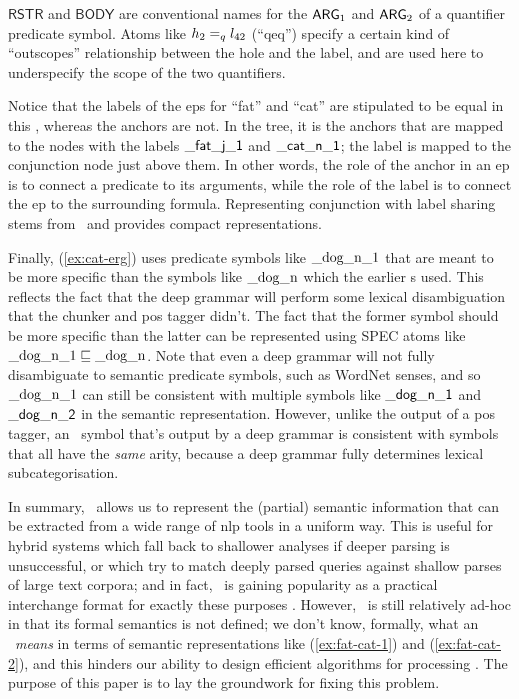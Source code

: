 $\mathsf{RSTR}$ and $\mathsf{BODY}$ are conventional names
for the $\mathsf{ARG}_1$ and $\mathsf{ARG}_2$ of a quantifier predicate symbol.  Atoms
like $h_2 =_q l_{42}$ (``qeq'') specify a certain kind of
``outscopes'' relationship between the hole and the label, and are
used here to underspecify the scope of the two quantifiers.

Notice that the labels of the {\sc ep}s for ``fat'' and ``cat'' are
stipulated to be equal in this \rmrs, whereas the anchors are not.  In
the tree, it is the anchors that are mapped to the nodes with the
labels $\mathsf{\_fat\_j\_1}$ and $\mathsf{\_cat\_n\_1}$; the label is
mapped to the conjunction node just above them.  In other words, the
role of the anchor in an {\sc ep} is to connect a predicate to its
arguments, while the role of the label is to connect the {\sc ep} to
the surrounding formula.  Representing conjunction with label sharing
stems from \mrs\ and provides compact representations.

Finally, (\ref{ex:cat-erg}) uses predicate symbols like
$\mathrm{\_dog\_n\_1}$ that are meant to be more specific than the
symbols like $\mathrm{\_dog\_n}$ which the earlier \rmrs s used.
This reflects the fact that the deep grammar will perform some lexical
disambiguation that the chunker and {\sc pos} tagger didn't.  The fact
that the former symbol should be more specific than the latter can be
represented using SPEC atoms like $\mathrm{\_dog\_n\_1}\sqsubseteq
\mathrm{\_dog\_n}$.
Note that even a deep grammar will not fully disambiguate to
semantic predicate symbols, such as WordNet senses, and so
$\mathrm{\_dog\_n\_1}$ can still be consistent with multiple symbols
like $\mathsf{\_dog\_n\_1}$ and $\mathsf{\_dog\_n\_2}$ in the semantic
representation.  However, unlike the output of a
{\sc pos} tagger, an \rmrs\ symbol that's output by a deep grammar is
consistent 
with symbols that all have the {\em same} arity, because a deep grammar
fully determines lexical subcategorisation.

In summary, \rmrs\ allows us to represent the (partial) semantic information
that can be extracted from a wide range of {\sc nlp} tools in a uniform way.
This is useful for hybrid systems which fall back to shallower
analyses if deeper parsing is unsuccessful, or which try to match
deeply parsed queries against shallow parses of large text corpora;
and in fact, \rmrs\ is gaining popularity as a practical interchange
format for exactly these purposes \cite{copestake:2003,frank:2004}.
However, \rmrs\ is still relatively ad-hoc in that its
formal semantics is
not defined; we don't know, formally, what an \rmrs\ \emph{means} in
terms of semantic representations like (\ref{ex:fat-cat-1}) and
(\ref{ex:fat-cat-2}), and this hinders our ability to design efficient
algorithms for processing \rmrs. The purpose of this paper is to lay
the groundwork for fixing this problem.

